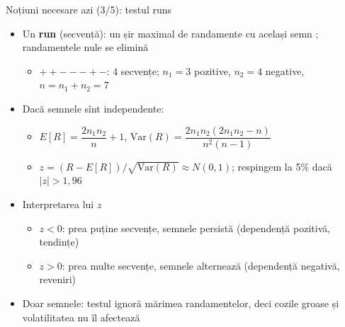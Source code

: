 \begin{frame}{Noțiuni necesare azi (3/5): testul runs}
\itemsize{\small}
\begin{itemize}
    \item Un \textbf{run} (secvență): un șir maximal de randamente cu același semn ; randamentele nule se elimină
    \begin{itemize}
        \item $+ + - - - + -$: 4 secvențe; $n_1 = 3$ pozitive, $n_2 = 4$ negative, $n = n_1 + n_2 = 7$
    \end{itemize}
    \item Dacă semnele sînt independente:
    \begin{itemize}
        \item $E[R] = \dfrac{2n_1n_2}{n} + 1$, \quad $\mathrm{Var}(R) = \dfrac{2n_1n_2(2n_1n_2 - n)}{n^2(n-1)}$
        \item $z = (R - E[R])/\sqrt{\mathrm{Var}(R)} \approx N(0, 1)$; respingem la 5\% dacă $|z| > 1{,}96$
    \end{itemize}
    \item Interpretarea lui $z$
    \begin{itemize}
        \item $z < 0$: prea puține secvențe, semnele persistă (dependență pozitivă, tendințe)
        \item $z > 0$: prea multe secvențe, semnele alternează (dependență negativă, reveniri)
    \end{itemize}
    \item Doar semnele: testul ignoră mărimea randamentelor, deci cozile groase și volatilitatea nu îl afectează
\end{itemize}
\end{frame}

